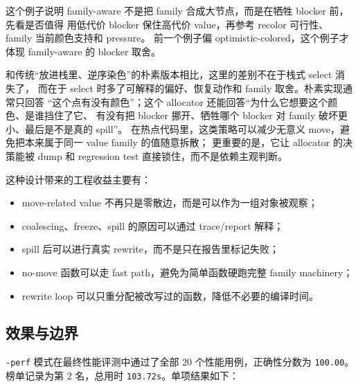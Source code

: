 \documentclass[UTF8,a4paper,11pt]{ctexart}
\begin{document}
这个例子说明 family-aware 不是把 family 合成大节点，而是在牺牲 blocker 前，先看是否值得
用低代价 blocker 保住高代价 value，再参考 recolor 可行性、family 当前颜色支持和 pressure。
前一个例子偏 optimistic-colored，这个例子才体现 family-aware 的 blocker 取舍。

和传统“放进栈里、逆序染色”的朴素版本相比，这里的差别不在于栈式 select 消失了，
而在于 select 时多了可解释的偏好、恢复动作和 family 取舍。朴素实现通常只回答
“这个点有没有颜色”；这个 allocator 还能回答“为什么它想要这个颜色、是谁挡住了它、
有没有把 blocker 挪开、牺牲哪个 blocker 对 family 破坏更小、最后是不是真的 spill”。
在热点代码里，这类策略可以减少无意义 move，避免把本来属于同一 value family 的值随意拆散；
更重要的是，它让 allocator 的决策能被 dump 和 regression test 直接锁住，而不是依赖主观判断。

这种设计带来的工程收益主要有：

\begin{itemize}
  \item move-related value 不再只是零散边，而是可以作为一组对象被观察；
  \item coalescing、freeze、spill 的原因可以通过 trace/report 解释；
  \item spill 后可以进行真实 rewrite，而不是只在报告里标记失败；
  \item no-move 函数可以走 fast path，避免为简单函数硬跑完整 family machinery；
  \item rewrite loop 可以只重分配被改写过的函数，降低不必要的编译时间。
\end{itemize}

\subsection{效果与边界}

\texttt{-perf} 模式在最终性能评测中通过了全部 20 个性能用例，正确性分数为
\texttt{100.00}。榜单记录为第 2 名，总用时 \texttt{103.72s}。单项结果如下：
\end{document}
